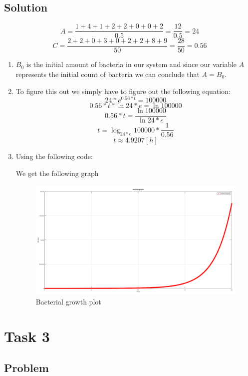 \documentclass[a4paper, 10pt]{article}
\begin{document}
		\subsection{Solution}
			\[A = \frac{1 + 4 + 1 + 2 + 2 + 0 + 0 + 2}{0.5} = \frac{12}{0.5} = 24\]
			\[C = \frac{2 + 2 + 0 + 3 + 0 + 2 + 2 + 8 + 9}{50} = \frac{28}{50} = 0.56\]
			
			\begin{enumerate}
				\item 
					$B_0$ is the initial amount of bacteria in our system and since our variable $A$ represents the initial count of bacteria we can conclude that $A = B_0$.
				\item 
					To figure this out we simply have to figure out the following equation:
					\[24*e^{0.56*t} = 100000\] \[0.56*t*\ln{24*e} = \ln{100000}\] 
					\[0.56*t = \frac{\ln{100000}}{\ln{24*e}}\]
					\[t = \log_{24*e}{100000} * \frac{1}{0.56}\]
					\[t \approx 4.9207 [h]\]
				\item 
					Using the following code:
					
					
					\noindent We get the following graph
					\begin{figure}[h]
						\centering
						\includegraphics[scale = 0.33]{BacterialGrowthGraph}
						\caption{Bacterial growth plot}
						\label{fig:bacterialGrowth}
					\end{figure}
			\end{enumerate}
	\section{Task 3}
	
		\subsection{Problem}
		
\end{document}

